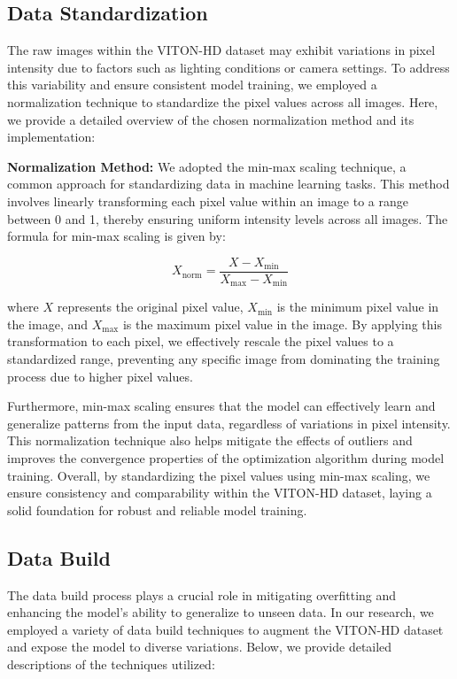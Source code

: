 \subsection{Data Standardization}

The raw images within the VITON-HD dataset may exhibit variations in pixel intensity due to factors such as lighting conditions or camera settings. To address this variability and ensure consistent model training, we employed a normalization technique to standardize the pixel values across all images. Here, we provide a detailed overview of the chosen normalization method and its implementation:

\textbf{Normalization Method:} We adopted the min-max scaling technique, a common approach for standardizing data in machine learning tasks. This method involves linearly transforming each pixel value within an image to a range between 0 and 1, thereby ensuring uniform intensity levels across all images. The formula for min-max scaling is given by:

\[
X_{\text{norm}} = \frac{X - X_{\text{min}}}{X_{\text{max}} - X_{\text{min}}}
\]

where \(X\) represents the original pixel value, \(X_{\text{min}}\) is the minimum pixel value in the image, and \(X_{\text{max}}\) is the maximum pixel value in the image. By applying this transformation to each pixel, we effectively rescale the pixel values to a standardized range, preventing any specific image from dominating the training process due to higher pixel values.

Furthermore, min-max scaling ensures that the model can effectively learn and generalize patterns from the input data, regardless of variations in pixel intensity. This normalization technique also helps mitigate the effects of outliers and improves the convergence properties of the optimization algorithm during model training. Overall, by standardizing the pixel values using min-max scaling, we ensure consistency and comparability within the VITON-HD dataset, laying a solid foundation for robust and reliable model training.


\subsection{Data Build}

The data build process plays a crucial role in mitigating overfitting and enhancing the model's ability to generalize to unseen data. In our research, we employed a variety of data build techniques to augment the VITON-HD dataset and expose the model to diverse variations. Below, we provide detailed descriptions of the techniques utilized:

